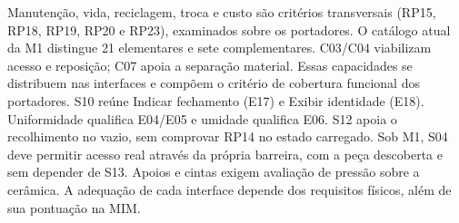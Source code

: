 Manutenção, vida, reciclagem, troca e custo são critérios transversais (RP15, RP18, RP19, RP20 e RP23), examinados sobre os portadores. O catálogo atual da M1 distingue 21 elementares e sete complementares. C03/C04 viabilizam acesso e reposição; C07 apoia a separação material. Essas capacidades se distribuem nas interfaces e compõem o critério de cobertura funcional dos portadores. S10 reúne Indicar fechamento (E17) e Exibir identidade (E18). Uniformidade qualifica E04/E05 e umidade qualifica E06. S12 apoia o recolhimento no vazio, sem comprovar RP14 no estado carregado. Sob M1, S04 deve permitir acesso real através da própria barreira, com a peça descoberta e sem depender de S13. Apoios e cintas exigem avaliação de pressão sobre a cerâmica. A adequação de cada interface depende dos requisitos físicos, além de sua pontuação na MIM.

